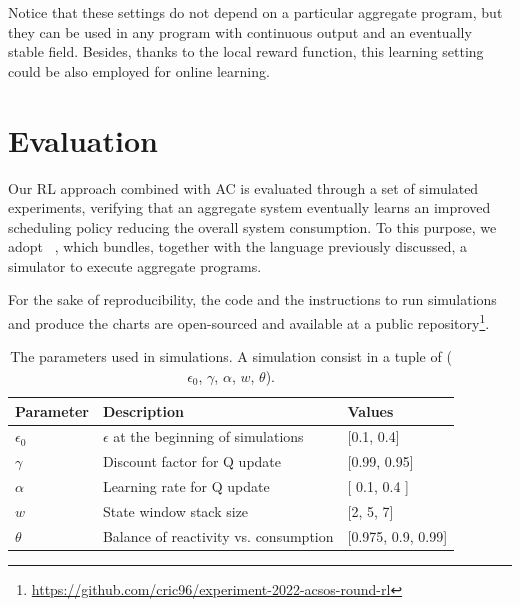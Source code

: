 Notice that these settings do not depend on a particular aggregate program, 
 but they can be used in any program with continuous output and an eventually stable field. 
%
Besides, thanks to the local reward function, this learning setting could be also employed for online learning.

\newcommand{\rlsol}{{\sc{}Rl}}
\newcommand{\periodicsol}{{\sc{}Periodic}}
\newcommand{\adhocsol}{{\sc{}Ad-hoc}}
\newcommand{\swapscen}{{\sc{}Swap}}
\newcommand{\multiswap}{{\sc{}MultiSwap}}
\section{Evaluation}\label{acsos2022:sec:evaluation}


Our \ac{RL} approach combined with \ac{AC} is evaluated through a set of simulated experiments, 
 verifying that an aggregate system eventually learns an improved scheduling policy reducing the overall system consumption.
%
To this purpose, we adopt \scafi{}~\cite{DBLP:conf/isola/CasadeiVAD20}, 
 which bundles, together with the language previously discussed, a simulator to execute aggregate programs.
 
%
For the sake of reproducibility, the code and the instructions to run simulations and produce the charts are open-sourced and available at a public repository\footnote{\url{https://github.com/cric96/experiment-2022-acsos-round-rl}}.
\begin{table}[t]
    \centering
    \begin{tabular}{|l|l|l|}
    \hline
    Parameter & Description & Values                 \\ \hline
    $\epsilon_0$ & $\epsilon$ at the beginning of simulations & {[}0.1, 0.4{]}        \\ \hline
    $\gamma$  & Discount factor for Q update & {[}0.99, 0.95{]}   \\ \hline
    $\alpha$ & Learning rate for Q update & {[} 0.1, 0.4 {]}                    \\ \hline
    $w$     & State window stack size  & {[}2, 5, 7{]}          \\ \hline
    $\theta$ & Balance of reactivity vs. consumption & {[}0.975, 0.9, 0.99{]} \\ \hline
    \end{tabular}
    \caption{The parameters used in simulations. A simulation consist in a tuple of ($\epsilon_0$, $\gamma$, $\alpha$, $w$, $\theta$).}
    \label{acsos2022:tab:parameters}
\end{table}
